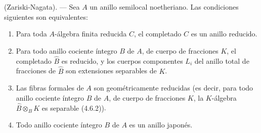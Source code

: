 \begin{theorem}[7.6.4]
(Zariski-Nagata). --- Sea $A$ un anillo semilocal noetheriano. Las
condiciones siguientes son equivalentes:
\begin{enumerate}
\item[\emph{a)}] Para toda $A$-álgebra finita reducida $C$, el completado
$\widehat C$ es un anillo reducido.
\item[\emph{a$'$)}] Para todo anillo cociente íntegro $B$ de $A$, de cuerpo
de fracciones $K$, el completado $\widehat B$ es reducido, y los cuerpos
componentes $L_i$ del anillo total de fracciones de $\widehat B$ son
extensiones separables de $K$.
\item[\emph{a$''$)}] Las fibras formales de $A$ son geométricamente
reducidas \textup{(es decir, para todo anillo cociente íntegro $B$ de $A$, de
cuerpo de fracciones $K$, la $K$-álgebra $\widehat B\otimes_BK$ es
separable (4.6.2))}.
\item[\emph{b)}] Todo anillo cociente íntegro $B$ de $A$ es un anillo
japonés.
\end{enumerate}
\end{theorem}

